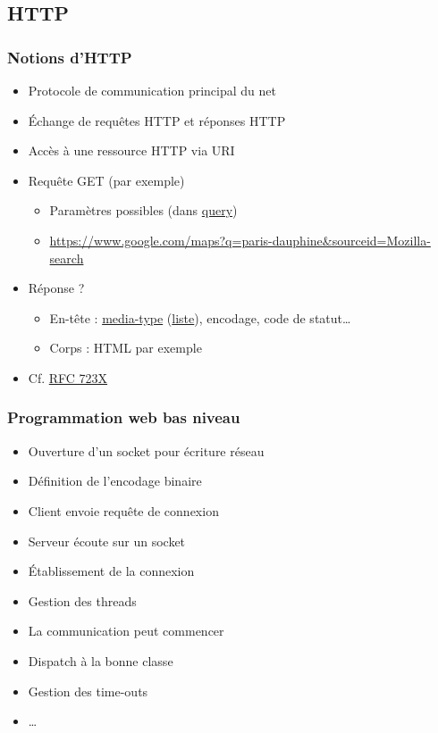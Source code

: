 \documentclass[english, french]{beamer}
\begin{document}
\subsection{HTTP}
\begin{frame}
	\frametitle{Notions d’HTTP}
	\begin{itemize}
		\item Protocole de communication principal du net
		\item Échange de requêtes HTTP et réponses HTTP
		\item Accès à une ressource HTTP via URI
		\item Requête GET (par exemple)
		\begin{itemize}
			\item Paramètres possibles (dans \og{}\href{http://tools.ietf.org/html/rfc3986\#section-3.4}{query}\fg{})
			\item \url{https://www.google.com/maps?q=paris-dauphine&sourceid=Mozilla-search}
		\end{itemize}
		\item Réponse ?\pause
		\begin{itemize}
			\item En-tête : \href{http://tools.ietf.org/html/rfc7231\#section-3.1.1.1}{media-type} (\href{http://www.iana.org/assignments/media-types/}{liste}), encodage, code de statut…
			\item Corps : HTML par exemple
		\end{itemize}
		\item Cf. \href{http://www.w3.org/Protocols/}{RFC 723X}
	\end{itemize}
\end{frame}

\begin{frame}
	\frametitle{Programmation web \og{}bas\fg{} niveau}
	\begin{itemize}
		\item Ouverture d’un socket pour écriture réseau
		\item Définition de l’encodage binaire
		\item Client envoie requête de connexion
		\item Serveur écoute sur un socket
		\item Établissement de la connexion
		\item Gestion des threads
		\item La communication peut commencer
		\item Dispatch à la bonne classe
		\item Gestion des time-outs
		\item …
	\end{itemize}
\end{frame}
\end{document}
